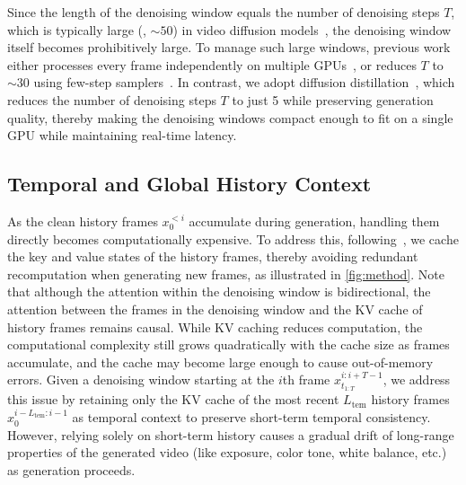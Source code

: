 Since the length of the denoising window equals the number of denoising steps $T$, which is typically large (\ie, $\sim50$) in video diffusion models~\citep{wan2025wan}, the denoising window itself becomes prohibitively large. 
To manage such large windows, previous work either processes every frame independently on multiple GPUs~\citep{kim2024fifo}, or reduces $T$ to $\sim30$ using few-step samplers~\citep{xie2025progressive}.
In contrast, we adopt diffusion distillation~\citep{yin2024one, yin2024improved}, which reduces the number of denoising steps $T$ to just 5 while preserving generation quality, thereby making the denoising windows compact enough to fit on a single GPU while maintaining real-time latency.


\subsection{Temporal and Global History Context}
\label{sec:kvcache}


As the clean history frames $x^{<i}_0$ accumulate during generation, handling them directly becomes computationally expensive. To address this, following~\citet{huang2025self}, we cache the key and value states of the history frames, thereby avoiding redundant recomputation when generating new frames, as illustrated in \cref{fig:method}. Note that although the attention within the denoising window is bidirectional, the attention between the frames in the denoising window and the KV cache of history frames remains causal. 
While KV caching reduces computation, the computational complexity still grows quadratically with the cache size as frames accumulate, and the cache may become large enough to cause out-of-memory errors. Given a denoising window starting at the $i$th frame $x^{i:i+T-1}_{t_{1:T}}$, we address this issue by retaining only the KV cache of the most recent $L_{\mathrm{tem}}$ history frames $x^{i-L_{\mathrm{tem}}:i-1}_0$ as temporal context to preserve short-term temporal consistency. However, relying solely on short-term history causes a gradual drift of long-range properties of the generated video (like exposure, color tone, white balance, etc.) as generation proceeds.



